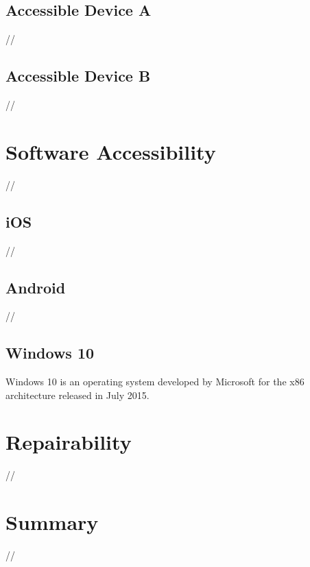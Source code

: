 
\subsection{Accessible Device A}
//


\subsection{Accessible Device B}
//


\section{Software Accessibility}
//


\subsection{iOS}
//


\subsection{Android}
//


\subsection{Windows 10}
Windows 10 is an operating system developed by Microsoft for the x86 architecture released in July 2015.


\section{Repairability}
//


\section{Summary}
//